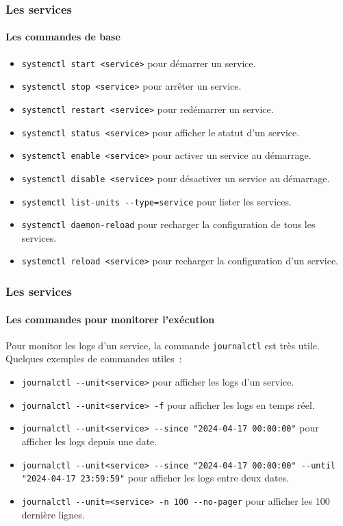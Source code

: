 \documentclass{beamer}
\begin{document}
    \begin{frame}
        \transdissolve
        \frametitle{Les services}
        \framesubtitle{Les commandes de base}
        \begin{itemize}
            \item \lstinline{systemctl start <service>} pour démarrer un service.
            \item \lstinline{systemctl stop <service>} pour arrêter un service.
            \item \lstinline{systemctl restart <service>} pour redémarrer un service.
            \item \lstinline{systemctl status <service>} pour afficher le statut d'un service.
            \item \lstinline{systemctl enable <service>} pour activer un service au démarrage.
            \item \lstinline{systemctl disable <service>} pour désactiver un service au démarrage.
            \item \lstinline{systemctl list-units --type=service} pour lister les services.
            \item \lstinline{systemctl daemon-reload} pour recharger la configuration de tous les services.
            \item \lstinline{systemctl reload <service>} pour recharger la configuration d'un service.
        \end{itemize}
    \end{frame}
    \begin{frame}
        \transdissolve
        \frametitle{Les services}
        \framesubtitle{Les commandes pour monitorer l'exécution}
        Pour monitor les logs d'un service, la commande \lstinline{journalctl} est très utile.
        \bigbreak
        Quelques exemples de commandes utiles~:
        \begin{itemize}
            \item \lstinline{journalctl --unit<service>} pour afficher les logs d'un service.
            \item \lstinline{journalctl --unit<service> -f} pour afficher les logs en temps réel.
            \item \lstinline{journalctl --unit<service> --since "2024-04-17 00:00:00"} pour afficher les logs depuis une date.
            \item \lstinline{journalctl --unit<service> --since "2024-04-17 00:00:00" --until "2024-04-17 23:59:59"} pour afficher les logs entre deux dates.
            \item \lstinline{journalctl --unit=<service> -n 100 --no-pager} pour afficher les 100 dernière lignes.
        \end{itemize}
    \end{frame}
\end{document}
